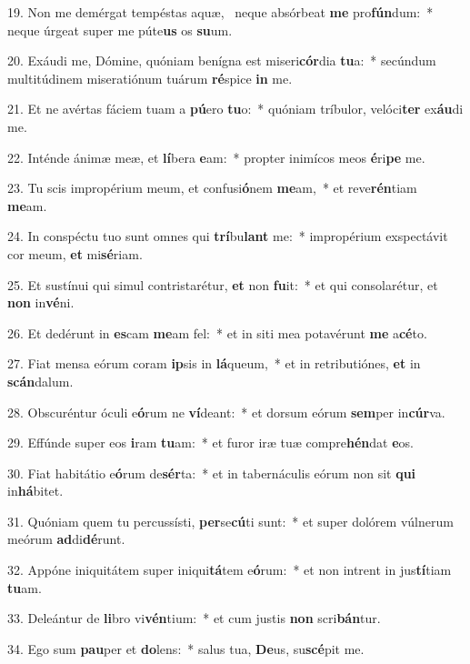 19. Non me demérgat tempéstas aquæ, \dag\  neque absórbeat \textbf{me} pro\textbf{fún}dum:~*  neque úrgeat super me púte\textbf{us} os \textbf{su}um.\

20. Exáudi me, Dómine, quóniam benígna est miseri\textbf{cór}dia \textbf{tu}a:~*  secúndum multitúdinem miseratiónum tuárum \textbf{ré}spice \textbf{in} me.\

21. Et ne avértas fáciem tuam a \textbf{pú}ero \textbf{tu}o:~*  quóniam tríbulor, velóci\textbf{ter} ex\textbf{áu}di me.\

22. Inténde ánimæ meæ, et \textbf{lí}bera \textbf{e}am:~*  propter inimícos meos \textbf{é}ri\textbf{pe} me.\

23. Tu scis impropérium meum, et confusi\textbf{ó}nem \textbf{me}am,~*  et reve\textbf{rén}tiam \textbf{me}am.\

24. In conspéctu tuo sunt omnes qui \textbf{trí}bu\textbf{lant} me:~*  impropérium exspectávit cor meum, \textbf{et} mi\textbf{sé}riam.\

25. Et sustínui qui simul contristarétur, \textbf{et} non \textbf{fu}it:~*  et qui consolarétur, et \textbf{non} in\textbf{vé}ni.\

26. Et dedérunt in \textbf{es}cam \textbf{me}am fel:~*  et in siti mea potavérunt \textbf{me} a\textbf{cé}to.\

27. Fiat mensa eórum coram \textbf{ip}sis in \textbf{lá}queum,~*  et in retributiónes, \textbf{et} in \textbf{scán}dalum.\

28. Obscuréntur óculi e\textbf{ó}rum ne \textbf{ví}deant:~*  et dorsum eórum \textbf{sem}per in\textbf{cúr}va.\

29. Effúnde super eos \textbf{i}ram \textbf{tu}am:~*  et furor iræ tuæ compre\textbf{hén}dat \textbf{e}os.\

30. Fiat habitátio e\textbf{ó}rum de\textbf{sér}ta:~*  et in tabernáculis eórum non sit \textbf{qui} in\textbf{há}bitet.\

31. Quóniam quem tu percussísti, \textbf{per}se\textbf{cú}ti sunt:~*  et super dolórem vúlnerum meórum \textbf{ad}di\textbf{dé}runt.\

32. Appóne iniquitátem super iniqui\textbf{tá}tem e\textbf{ó}rum:~*  et non intrent in jus\textbf{tí}tiam \textbf{tu}am.\

33. Deleántur de \textbf{li}bro vi\textbf{vén}tium:~*  et cum justis \textbf{non} scri\textbf{bán}tur.\

34. Ego sum \textbf{pau}per et \textbf{do}lens:~*  salus tua, \textbf{De}us, su\textbf{scé}pit me.\

